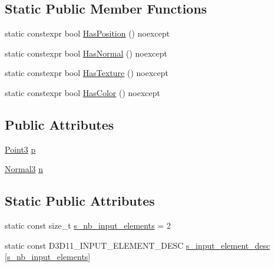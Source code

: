 \subsection*{Static Public Member Functions}
\begin{DoxyCompactItemize}
\item 
static constexpr bool \hyperlink{structmage_1_1_vertex_position_normal_a0a356004bb83c2616704bfbe63d936a7}{Has\+Position} () noexcept
\item 
static constexpr bool \hyperlink{structmage_1_1_vertex_position_normal_a28b610b6d83944e77983262869c5aaa1}{Has\+Normal} () noexcept
\item 
static constexpr bool \hyperlink{structmage_1_1_vertex_position_normal_a049430623134ff702e768bda3bc96860}{Has\+Texture} () noexcept
\item 
static constexpr bool \hyperlink{structmage_1_1_vertex_position_normal_a6bd96547f8a39dd0fa0ecd2b478f7213}{Has\+Color} () noexcept
\end{DoxyCompactItemize}
\subsection*{Public Attributes}
\begin{DoxyCompactItemize}
\item 
\hyperlink{structmage_1_1_point3}{Point3} \hyperlink{structmage_1_1_vertex_position_normal_ac95e9941363ec5687f0bf21e59b83940}{p}
\item 
\hyperlink{structmage_1_1_normal3}{Normal3} \hyperlink{structmage_1_1_vertex_position_normal_a09baa618081e66e21cdfe5752dbf8df6}{n}
\end{DoxyCompactItemize}
\subsection*{Static Public Attributes}
\begin{DoxyCompactItemize}
\item 
static const size\+\_\+t \hyperlink{structmage_1_1_vertex_position_normal_a6201d147655b9fb0cf6117ba724b07ef}{s\+\_\+nb\+\_\+input\+\_\+elements} = 2
\item 
static const D3\+D11\+\_\+\+I\+N\+P\+U\+T\+\_\+\+E\+L\+E\+M\+E\+N\+T\+\_\+\+D\+E\+SC \hyperlink{structmage_1_1_vertex_position_normal_aa597c602ce172e523bece0e75d157081}{s\+\_\+input\+\_\+element\+\_\+desc} \mbox{[}\hyperlink{structmage_1_1_vertex_position_normal_a6201d147655b9fb0cf6117ba724b07ef}{s\+\_\+nb\+\_\+input\+\_\+elements}\mbox{]}
\end{DoxyCompactItemize}


